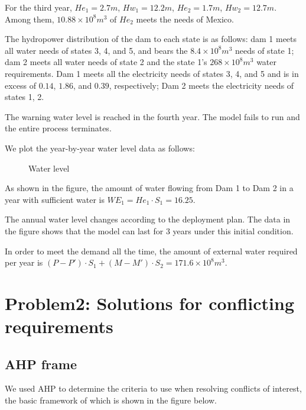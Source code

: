 \documentclass{mcmthesis}
\begin{document}
For the third year, $He_1=2.7m$, $Hw_1=12.2m$, $He_2=1.7m$, $Hw_2=12.7m$.
Among them, $10.88\times 10^8m^3$ of $He_2$ meets the needs of Mexico.

The hydropower distribution of the dam to each state is as follows: dam 1 meets all water needs of states 3, 4, and 5, and bears the $8.4\times 10^8m^3$ needs of state 1; dam 2 meets all water needs of state 2 and the state 1's $268\times10^8m^3$ water requirements.
Dam 1 meets all the electricity needs of states 3, 4, and 5 and is in excess of $0.14$, $1.86$, and $0.39$, respectively; Dam 2 meets the electricity needs of states 1, 2.

The warning water level is reached in the fourth year. The model fails to run and the entire process terminates.

We plot the year-by-year water level data as follows:

\begin{figure}[h]
	\caption{Water level}
	\centering
\end{figure}

As shown in the figure, the amount of water flowing from Dam 1 to Dam 2 in a year with sufficient water is $WE_1=He_1\cdot S_1=16.25$.

The annual water level changes according to the deployment plan. The data in the figure shows that the model can last for 3 years under this initial condition.

In order to meet the demand all the time, the amount of external water required per year is $(P-P')\cdot S_1+(M-M')\cdot S_2=171.6\times 10^8m^3$.


\section{Problem2: Solutions for conflicting requirements}
\subsection{AHP frame}
We used AHP to determine the criteria to use when resolving conflicts of interest, the basic framework of which is shown in the figure below.
\end{document}
